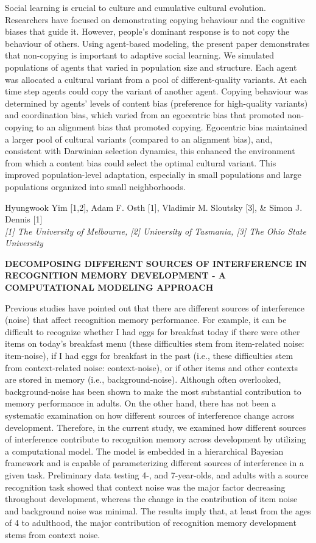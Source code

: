 \documentclass[]{article}
\begin{document}
Social learning is crucial to culture and cumulative cultural evolution.
Researchers have focused on demonstrating copying behaviour and the
cognitive biases that guide it. However, people's dominant response is
to not copy the behaviour of others. Using agent-based modeling, the
present paper demonstrates that non-copying is important to adaptive
social learning. We simulated populations of agents that varied in
population size and structure. Each agent was allocated a cultural
variant from a pool of different-quality variants. At each time step
agents could copy the variant of another agent. Copying behaviour was
determined by agents' levels of content bias (preference for
high-quality variants) and coordination bias, which varied from an
egocentric bias that promoted non-copying to an alignment bias that
promoted copying. Egocentric bias maintained a larger pool of cultural
variants (compared to an alignment bias), and, consistent with Darwinian
selection dynamics, this enhanced the environment from which a content
bias could select the optimal cultural variant. This improved
population-level adaptation, especially in small populations and large
populations organized into small neighborhoods.\\
\pagebreak  

Hyungwook Yim {[}1,2{]}, Adam F. Osth {[}1{]}, Vladimir M. Sloutsky
{[}3{]}, \& Simon J. Dennis {[}1{]}\\
\emph{{[}1{]} The University of Melbourne, {[}2{]} University of
Tasmania, {[}3{]} The Ohio State University}

\textbf{DECOMPOSING DIFFERENT SOURCES OF INTERFERENCE IN RECOGNITION
MEMORY DEVELOPMENT - A COMPUTATIONAL MODELING APPROACH}

Previous studies have pointed out that there are different sources of
interference (noise) that affect recognition memory performance. For
example, it can be difficult to recognize whether I had eggs for
breakfast today if there were other items on today's breakfast menu
(these difficulties stem from item-related noise: item-noise), if I had
eggs for breakfast in the past (i.e., these difficulties stem from
context-related noise: context-noise), or if other items and other
contexts are stored in memory (i.e., background-noise). Although often
overlooked, background-noise has been shown to make the most substantial
contribution to memory performance in adults. On the other hand, there
has not been a systematic examination on how different sources of
interference change across development. Therefore, in the current study,
we examined how different sources of interference contribute to
recognition memory across development by utilizing a computational
model. The model is embedded in a hierarchical Bayesian framework and is
capable of parameterizing different sources of interference in a given
task. Preliminary data testing 4-, and 7-year-olds, and adults with a
source recognition task showed that context noise was the major factor
decreasing throughout development, whereas the change in the
contribution of item noise and background noise was minimal. The results
imply that, at least from the ages of 4 to adulthood, the major
contribution of recognition memory development stems from context
noise.\\
\pagebreak  
\end{document}

